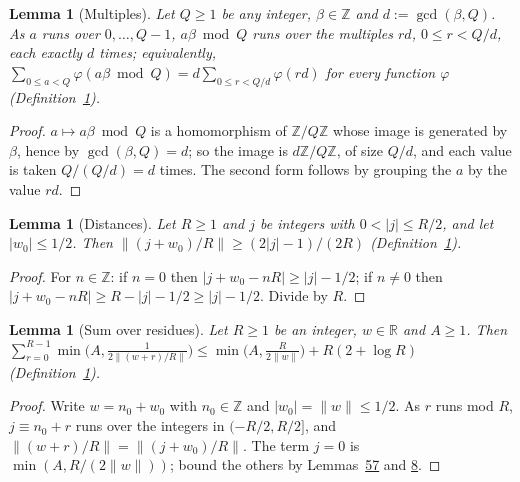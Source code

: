 \documentclass[11pt]{article}
\newcounter{hffc}
\theoremstyle{definition}\newtheorem{hffdef}[hffc]{Definition}
\theoremstyle{plain}\newtheorem{hfflem}[hffc]{Lemma}\newtheorem{hffthm}[hffc]{Theorem}
\theoremstyle{remark}\newtheorem{hffrem}[hffc]{Remark}
\newcommand{\hffcost}{}
\newcommand{\setcost}[1]{\renewcommand{\hffcost}{#1}}
\newcommand{\Z}{\mathbb{Z}}\newcommand{\R}{\mathbb{R}}\newcommand{\N}{\mathbb{N}}
\begin{document}
\begin{hfflem}[Multiples]\label{L:mult}
Let $Q\ge1$ be any integer, $\beta\in\Z$ and $d:=\gcd(\beta,Q)$. As $a$ runs over $0,\dots,Q-1$, $a\beta\bmod Q$ runs over the multiples $rd$, $0\le r<Q/d$, each exactly $d$ times; equivalently, $\sum_{0\le a<Q}\varphi(a\beta\bmod Q)=d\sum_{0\le r<Q/d}\varphi(rd)$ for every function $\varphi$ (Definition~\hyperref[D:conv]{1}).
\par\nopagebreak{}
\end{hfflem}
\begin{proof}\setcost{length 181/300}$a\mapsto a\beta\bmod Q$ is a homomorphism of $\Z/Q\Z$ whose image is generated by $\beta$, hence by $\gcd(\beta,Q)=d$; so the image is $d\Z/Q\Z$, of size $Q/d$, and each value is taken $Q/(Q/d)=d$ times. The second form follows by grouping the $a$ by the value $rd$.
\end{proof}

\begin{hfflem}[Distances]\label{L:dist}
Let $R\ge1$ and $j$ be integers with $0<|j|\le R/2$, and let $|w_0|\le1/2$. Then $\|(j+w_0)/R\|\ge(2|j|-1)/(2R)$ (Definition~\hyperref[D:conv]{1}).
\par\nopagebreak{}
\end{hfflem}
\begin{proof}\setcost{length 82/300}For $n\in\Z$: if $n=0$ then $|j+w_0-nR|\ge|j|-1/2$; if $n\ne0$ then $|j+w_0-nR|\ge R-|j|-1/2\ge|j|-1/2$. Divide by $R$.
\end{proof}

\begin{hfflem}[Sum over residues]\label{L:ressum}
Let $R\ge1$ be an integer, $w\in\R$ and $A\ge1$. Then $\sum_{r=0}^{R-1}\min\bigl(A,\frac1{2\|(w+r)/R\|}\bigr)\le\min\bigl(A,\frac R{2\|w\|}\bigr)+R(2+\log R)$ (Definition~\hyperref[D:conv]{1}).
\par\nopagebreak{}
\end{hfflem}
\begin{proof}\setcost{length 167/300}Write $w=n_0+w_0$ with $n_0\in\Z$ and $|w_0|=\|w\|\le1/2$. As $r$ runs mod $R$, $j\equiv n_0+r$ runs over the integers in $(-R/2,R/2]$, and $\|(w+r)/R\|=\|(j+w_0)/R\|$. The term $j=0$ is $\min(A,R/(2\|w\|))$; bound the others by Lemmas~\hyperref[L:dist]{57} and \hyperref[L:harm]{8}.
\end{proof}
\end{document}
